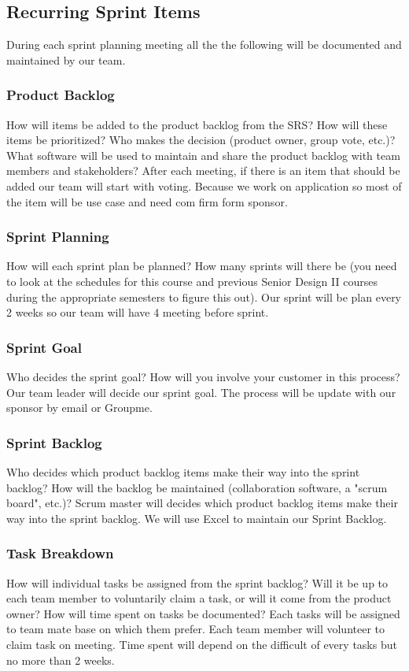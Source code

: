 \subsection{Recurring Sprint Items}
During each sprint planning meeting all the the following will be documented and maintained by our team.

\subsubsection{Product Backlog}
How will items be added to the product backlog from the SRS? How will these items be prioritized? Who makes the decision (product owner, group vote, etc.)? What software will be used to maintain and share the product backlog with team members and stakeholders?
After each meeting, if there is an item that should be added our team will start with voting. Because we work on application so most of the item will be use case and need com firm form sponsor.
\subsubsection{Sprint Planning}
How will each sprint plan be planned? How many sprints will there be (you need to look at the schedules for this course and previous Senior Design II courses during the appropriate semesters to figure this out).
Our sprint will be plan every 2 weeks so our team will have 4 meeting before sprint. 

\subsubsection{Sprint Goal}
Who decides the sprint goal? How will you involve your customer in this process?
Our team leader will decide our sprint goal. The process will be update with our sponsor by email or Groupme.
\subsubsection{Sprint Backlog}
Who decides which product backlog items make their way into the sprint backlog? How will the backlog be maintained (collaboration software, a "scrum board", etc.)?
Scrum master will decides  which product backlog items make their way into the sprint backlog. We will use Excel to maintain our Sprint Backlog.
\subsubsection{Task Breakdown}
How will individual tasks be assigned from the sprint backlog? Will it be up to each team member to voluntarily claim a task, or will it come from the product owner? How will time spent on tasks be documented?
Each tasks will be assigned to team mate base on which them prefer. Each team member will volunteer to claim task on meeting. Time spent will depend on the difficult of every tasks but no more than 2 weeks.


